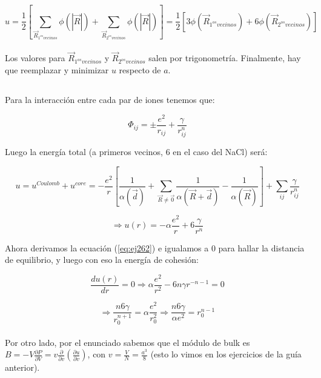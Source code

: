 \documentclass[a4paper]{article}
\begin{document}
$$ u = \frac{1}{2} \left[ \sum_{\vec{R}_{1^{os} vecinos}} \phi(|\vec{R}|) + \sum_{\vec{R}_{2^{os} vecinos}} \phi(|\vec{R}|)\right] = \frac{1}{2} \left[3\phi(\vec{R}_{1^{os} vecinos}) + 6\phi(\vec{R}_{2^{os} vecinos})\right]$$\\

Los valores para $\vec{R}_{1^{os} vecinos}$ y $\vec{R}_{2^{os} vecinos}$ salen por trigonometr\'ia. Finalmente, hay que reemplazar y minimizar $u$ respecto de $a$.

\subsection{}

Para la interacci\'on entre cada par de iones tenemos que:

\begin{equation}
\label{eq:ej26}
\Phi_{ij} = \pm \frac{e^{2}}{r_{ij}} + \frac{\gamma}{r^{n}_{ij}}
\end{equation}

Luego la energ\'ia total (a primeros vecinos, 6 en el caso del NaCl) ser\'a:

$$ u = u^{Coulomb} + u^{core} = -\frac{e^{2}}{r}\left[ \frac{1}{\alpha(\vec{d})} + \sum_{\vec{R} \neq \vec{0}} \frac{1}{\alpha(\vec{R} + \vec{d})}  - \frac{1}{\alpha(\vec{R})} \right] + \sum_{ij} \frac{\gamma}{r^{n}_{ij}}$$

\begin{equation}
\label{eq:ej262}
\Rightarrow u(r) = - \alpha \frac{e^{2}}{r} + 6\frac{\gamma}{r^{n}}
\end{equation}

Ahora derivamos la ecuaci\'on (\ref{eq:ej262}) e igualamos a 0 para hallar la distancia de equilibrio, y luego con eso la energ\'ia de cohesi\'on:

\begin{equation}
\label{eq:ej263}
\frac{du(r)}{dr} = 0 \Rightarrow \alpha \frac{e^{2}}{r^{2}} - 6n\gamma r^{-n-1} = 0
\end{equation}

$$ \Rightarrow \frac{n6 \gamma}{r_{0}^{n+1}} = \alpha \frac{e^{2}}{r_{0}^{2}} \Rightarrow \frac{n6\gamma}{\alpha e^{2}} = r_{0}^{n-1}$$\\

Por otro lado, por el enunciado sabemos que el m\'odulo de bulk es $B = -V \frac{\partial P}{\partial V} = v \frac{\partial}{\partial v}\left( \frac{\partial u}{\partial v}\right)$, con $v = \frac{V}{N} = \frac{a^{3}}{8}$ (esto lo vimos en los ejercicios de la gu\'ia anterior).\\
\end{document}
